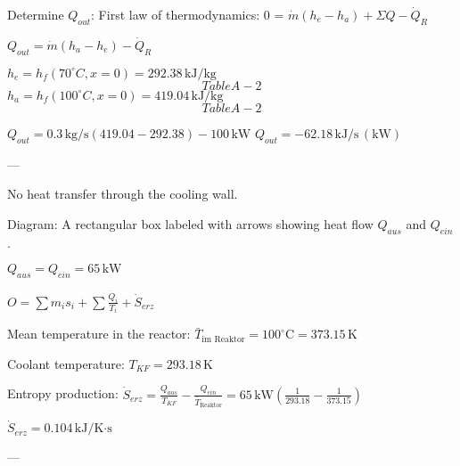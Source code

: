 Determine \( Q_{out} \):  
First law of thermodynamics:  
0 = \( \dot{m} (h_e - h_a) + \Sigma Q - \dot{Q}_R \)  

\( Q_{out} = \dot{m} (h_a - h_e) - \dot{Q}_R \)  

\( h_e = h_f (70^\circ C, x = 0) = 292.38 \, \text{kJ/kg} \) \[Table A-2\]  
\( h_a = h_f (100^\circ C, x = 0) = 419.04 \, \text{kJ/kg} \) \[Table A-2\]  

\( Q_{out} = 0.3 \, \text{kg/s} \left( 419.04 - 292.38 \right) - 100 \, \text{kW} \)  
\( Q_{out} = -62.18 \, \text{kJ/s} \, (\text{kW}) \)  

---

No heat transfer through the cooling wall.  

Diagram: A rectangular box labeled with arrows showing heat flow \( Q_{aus} \) and \( Q_{ein} \).  

\( Q_{aus} = Q_{ein} = 65 \, \text{kW} \)  

\( O = \sum m_i s_i + \sum \frac{\dot{Q}_i}{T_i} + \dot{S}_{erz} \)  

Mean temperature in the reactor:  
\( \bar{T}_{\text{im Reaktor}} = 100^\circ \text{C} = 373.15 \, \text{K} \)  

Coolant temperature:  
\( T_{KF} = 293.18 \, \text{K} \)  

Entropy production:  
\( \dot{S}_{erz} = \frac{Q_{aus}}{T_{KF}} - \frac{Q_{ein}}{\bar{T}_{\text{Reaktor}}} = 65 \, \text{kW} \left( \frac{1}{293.18} - \frac{1}{373.15} \right) \)  

\( \dot{S}_{erz} = 0.104 \, \text{kJ/K·s} \)  

---